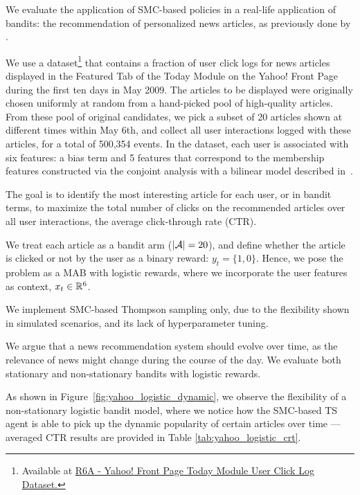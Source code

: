 We evaluate the application of SMC-based policies in a real-life application of bandits:
the recommendation of personalized news articles, as previously done by \citet{ic-Chapelle2011}.
%

We use a dataset\footnote{
	Available at \href{https://webscope.sandbox.yahoo.com/catalog.php?datatype=r\&did=49}{R6A - Yahoo! Front Page Today Module User Click Log Dataset.}
} that contains a fraction of user click logs for news articles displayed in the Featured Tab of the Today Module on the Yahoo! Front Page during the first ten days in May 2009. The articles to be displayed were originally chosen uniformly at random from a hand-picked pool of high-quality articles.
From these pool of original candidates,
we pick a subset of 20 articles shown at different times within May 6th,
and collect all user interactions logged with these articles,
for a total of 500,354 events.
In the dataset,
each user is associated with six features:
a bias term and 5 features that correspond to the membership features constructed via the conjoint analysis with a bilinear model described in~\citep{ip-Chu2009}.

The goal is to identify the most interesting article for each user,
or in bandit terms,
to maximize the total number of clicks on the recommended articles over all user interactions,
\ie the average click-through rate (CTR).

We treat each article as a bandit arm ($|\mathcal{A}|=20$),
and define whether the article is clicked or not by the user as a binary reward: $y_t=\{1,0\}$.
Hence, we pose the problem as a MAB with logistic rewards,
where we incorporate the user features as context, $x_t\in {\mathbb R}^6$.

We implement SMC-based Thompson sampling only, due to the flexibility shown in simulated scenarios,
and its lack of hyperparameter tuning.

We argue that a news recommendation system should evolve over time,
as the relevance of news might change during the course of the day.
We evaluate both stationary and non-stationary bandits with logistic rewards.

As shown in Figure~\ref{fig:yahoo_logistic_dynamic},
we observe the flexibility of a non-stationary logistic bandit model,
where we notice how the SMC-based TS agent is able to pick up the dynamic popularity of certain articles over time
---averaged CTR results are provided in Table \ref{tab:yahoo_logistic_crt}.

